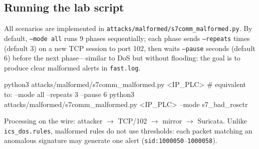 \documentclass[../main.tex]{subfiles}
\begin{document}
\subsection{Running the lab script}

All scenarios are implemented in \texttt{attacks/malformed/s7comm\_malformed.py}. By default, \texttt{--mode all} runs 9 phases sequentially; each phase sends \texttt{--repeats} times (default 3) on a new TCP session to port 102, then waits \texttt{--pause} seconds (default 6) before the next phase---similar to DoS but without flooding: the goal is to produce clear malformed alerts in \texttt{fast.log}.

\begin{packetdump}
python3 attacks/malformed/s7comm_malformed.py <IP_PLC>
# equivalent to: --mode all --repeats 3 --pause 6
python3 attacks/malformed/s7comm_malformed.py <IP_PLC> --mode s7_bad_rosctr
\end{packetdump}

Processing on the wire: attacker $\rightarrow$ TCP/102 $\rightarrow$ mirror $\rightarrow$ Suricata. Unlike \texttt{ics\_dos.rules}, malformed rules do not use thresholds: each packet matching an anomalous signature may generate one alert (\texttt{sid:1000050}--\texttt{1000058}).
\end{document}
